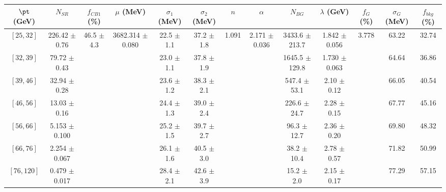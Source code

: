 \begin{tabular}{c||c|c|c|c|c|c|c|c|c|c|c||c}
$\pt$ (GeV) & $N_{SR}$ & $f_{CB1}$ (\%) & $\mu$ (MeV) & $\sigma_1$ (MeV) & $\sigma_2$ (MeV) & $n$ & $\alpha$ & $N_{BG}$ & $\lambda$ (GeV) & $f_G$ (\%) & $\sigma_G$ (MeV) & $f_{bkg}$ (\%) \\
\hline
$[25, 32]$ & 226.42 $\pm$ 0.76 & \multirow{7}{*}{46.5 $\pm$ 4.3} & \multirow{7}{*}{3682.314 $\pm$ 0.080} & 22.5 $\pm$ 1.1 & 37.2 $\pm$ 1.8 & \multirow{7}{*}{1.091} & \multirow{7}{*}{2.171 $\pm$ 0.036} & 3433.6 $\pm$ 213.7 & 1.842 $\pm$ 0.056 & \multirow{7}{*}{3.778} & 63.22 & 32.74\\
$[32, 39]$ & 79.72 $\pm$ 0.43 &  &  & 23.0 $\pm$ 1.1 & 37.8 $\pm$ 1.9 &  &  & 1645.5 $\pm$ 129.8 & 1.730 $\pm$ 0.063 &  & 64.64 & 36.86\\
$[39, 46]$ & 32.94 $\pm$ 0.28 &  &  & 23.6 $\pm$ 1.2 & 38.3 $\pm$ 2.1 &  &  & 547.4 $\pm$ 53.1 & 2.10 $\pm$ 0.12 &  & 66.05 & 40.54\\
$[46, 56]$ & 13.03 $\pm$ 0.16 &  &  & 24.4 $\pm$ 1.3 & 39.0 $\pm$ 2.4 &  &  & 226.6 $\pm$ 24.7 & 2.28 $\pm$ 0.15 &  & 67.77 & 45.16\\
$[56, 66]$ & 5.153 $\pm$ 0.100 &  &  & 25.2 $\pm$ 1.5 & 39.7 $\pm$ 2.7 &  &  & 96.3 $\pm$ 12.7 & 2.36 $\pm$ 0.20 &  & 69.80 & 48.32\\
$[66, 76]$ & 2.254 $\pm$ 0.067 &  &  & 26.1 $\pm$ 1.6 & 40.5 $\pm$ 3.0 &  &  & 38.2 $\pm$ 10.4 & 2.78 $\pm$ 0.57 &  & 71.82 & 50.99\\
$[76, 120]$ & 0.479 $\pm$ 0.017 &  &  & 28.4 $\pm$ 2.1 & 42.6 $\pm$ 3.9 &  &  & 15.2 $\pm$ 2.0 & 2.15 $\pm$ 0.17 &  & 77.29 & 57.15\\
\end{tabular}
